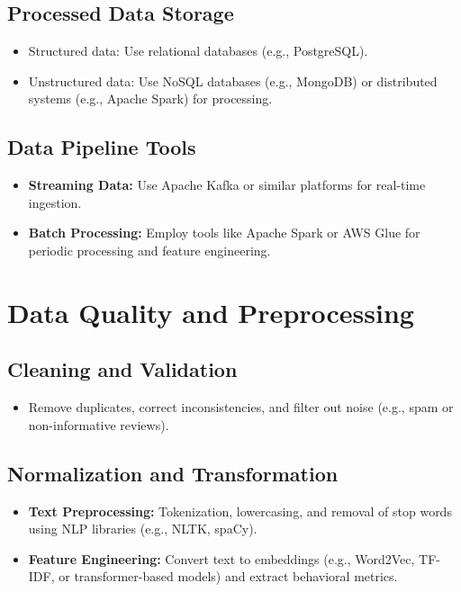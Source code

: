 \documentclass[11pt]{article}
\begin{document}
\subsection*{Processed Data Storage}
\begin{itemize}[noitemsep]
    \item Structured data: Use relational databases (e.g., PostgreSQL).
    \item Unstructured data: Use NoSQL databases (e.g., MongoDB) or distributed systems (e.g., Apache Spark) for processing.
\end{itemize}

\subsection*{Data Pipeline Tools}
\begin{itemize}[noitemsep]
    \item \textbf{Streaming Data:} Use Apache Kafka or similar platforms for real-time ingestion.
    \item \textbf{Batch Processing:} Employ tools like Apache Spark or AWS Glue for periodic processing and feature engineering.
\end{itemize}

\section{Data Quality and Preprocessing}
\subsection*{Cleaning and Validation}
\begin{itemize}[noitemsep]
    \item Remove duplicates, correct inconsistencies, and filter out noise (e.g., spam or non-informative reviews).
\end{itemize}

\subsection*{Normalization and Transformation}
\begin{itemize}[noitemsep]
    \item \textbf{Text Preprocessing:} Tokenization, lowercasing, and removal of stop words using NLP libraries (e.g., NLTK, spaCy).
    \item \textbf{Feature Engineering:} Convert text to embeddings (e.g., Word2Vec, TF-IDF, or transformer-based models) and extract behavioral metrics.
\end{itemize}
\end{document}
